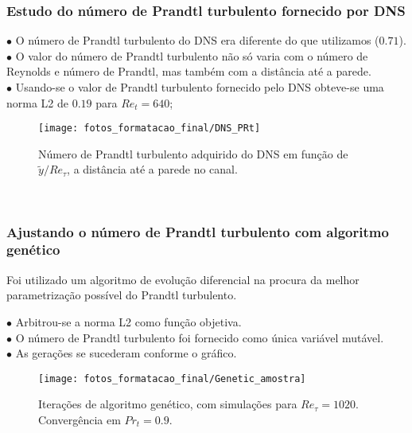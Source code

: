 \documentclass[xcolor=dvipsnames,10pt,aspectratio=169]{beamer}
\begin{document}
		\begin{frame}
		\frametitle{Estudo do número de Prandtl turbulento fornecido por DNS}
		\begin{minipage}[h!]{0.29\textwidth}
			$\bullet$ O número de Prandtl turbulento do DNS era diferente do que utilizamos ($0.71$).\\
      $\bullet$ O valor do número de Prandtl turbulento não só varia com o número de Reynolds e número de Prandtl, mas também com a distância até a parede.\\
      $\bullet$ Usando-se o valor de Prandtl turbulento fornecido pelo DNS obteve-se uma norma L2 de $0.19$ para $Re_t = 640$;
		\end{minipage}\hfill
		\begin{minipage}[h!]{0.60\textwidth}
      \begin{figure}[h!]
        \centering
        \texttt{[image: fotos\_formatacao\_final/DNS\_PRt]}
        \caption{Número de Prandtl turbulento adquirido do DNS em função de $ \tilde{y}/Re_\tau $, a distância até a parede no canal.}
        \label{figure5}
      \end{figure}
		\end{minipage}	\\
		\end{frame}
	
	
		\begin{frame}
		\frametitle{Ajustando o número de Prandtl turbulento com algoritmo genético}
		\begin{minipage}[h!]{0.39\textwidth}
      Foi utilizado um algoritmo de evolução diferencial na procura da melhor parametrização possível do Prandtl turbulento.

      $\bullet$ Arbitrou-se a norma L2 como função objetiva.\\
      $\bullet$ O número de Prandtl turbulento foi fornecido como única variável mutável.\\
      $\bullet$ As gerações se sucederam conforme o gráfico.\\

		\end{minipage}
    \begin{minipage}[h!]{0.60\textwidth}
      \begin{figure}[!h]
        \centering
        \texttt{[image: fotos\_formatacao\_final/Genetic\_amostra]}
        \caption{Iterações de algoritmo genético, com simulações para $Re_\tau = 1020$. Convergência em $Pr_t = 0.9 $.}
      \end{figure}
      \end{minipage}	
		\end{frame}
		
\end{document}
